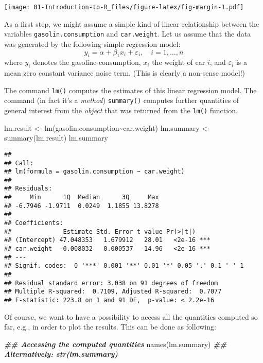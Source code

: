 \documentclass[
]{book}
\newenvironment{Shaded}{\begin{snugshade}}{\end{snugshade}}
\newcommand{\DocumentationTok}[1]{\textcolor[rgb]{0.56,0.35,0.01}{\textbf{\textit{#1}}}}
\newcommand{\FunctionTok}[1]{\textcolor[rgb]{0.00,0.00,0.00}{#1}}
\newcommand{\NormalTok}[1]{#1}
\newcommand{\OtherTok}[1]{\textcolor[rgb]{0.56,0.35,0.01}{#1}}
\newcommand{\SpecialCharTok}[1]{\textcolor[rgb]{0.00,0.00,0.00}{#1}}
\begin{document}
\texttt{[image: 01-Introduction-to-R\_files/figure-latex/fig-margin-1.pdf]}

\hfill\break

As a first step, we might assume a simple kind of linear relationship between the variables \texttt{gasolin.consumption} and \texttt{car.weight}. Let us assume that the data was generated by the following simple regression model:
\[
y_i=\alpha+\beta_1 x_i+\varepsilon_i,\quad i=1,\dots,n
\]
where \(y_i\) denotes the gasoline-consumption, \(x_i\) the weight of car \(i\), and \(\varepsilon_i\) is a mean zero constant variance noise term. (This is clearly a non-sense model!)

The command \texttt{lm()} computes the estimates of this linear regression model. The command (in fact it's a \emph{method}) \texttt{summary()} computes further quantities of general interest from the \emph{object} that was returned from the \texttt{lm()} function.

\begin{Shaded}
\begin{Highlighting}[]
\NormalTok{lm.result   }\OtherTok{\textless{}{-}} \FunctionTok{lm}\NormalTok{(gasolin.consumption}\SpecialCharTok{\textasciitilde{}}\NormalTok{car.weight)}
\NormalTok{lm.summary  }\OtherTok{\textless{}{-}} \FunctionTok{summary}\NormalTok{(lm.result)}
\NormalTok{lm.summary}
\end{Highlighting}
\end{Shaded}

\begin{verbatim}
## 
## Call:
## lm(formula = gasolin.consumption ~ car.weight)
## 
## Residuals:
##     Min      1Q  Median      3Q     Max 
## -6.7946 -1.9711  0.0249  1.1855 13.8278 
## 
## Coefficients:
##              Estimate Std. Error t value Pr(>|t|)    
## (Intercept) 47.048353   1.679912   28.01   <2e-16 ***
## car.weight  -0.008032   0.000537  -14.96   <2e-16 ***
## ---
## Signif. codes:  0 '***' 0.001 '**' 0.01 '*' 0.05 '.' 0.1 ' ' 1
## 
## Residual standard error: 3.038 on 91 degrees of freedom
## Multiple R-squared:  0.7109, Adjusted R-squared:  0.7077 
## F-statistic: 223.8 on 1 and 91 DF,  p-value: < 2.2e-16
\end{verbatim}

\hfill\break

Of course, we want to have a possibility to access all the quantities computed so far, e.g., in order to plot the results. This can be done as following:

\begin{Shaded}
\begin{Highlighting}[]
\DocumentationTok{\#\# Accessing the computed quantities}
\FunctionTok{names}\NormalTok{(lm.summary) }\DocumentationTok{\#\# Alternatively: str(lm.summary)}
\end{Highlighting}
\end{Shaded}
\end{document}
